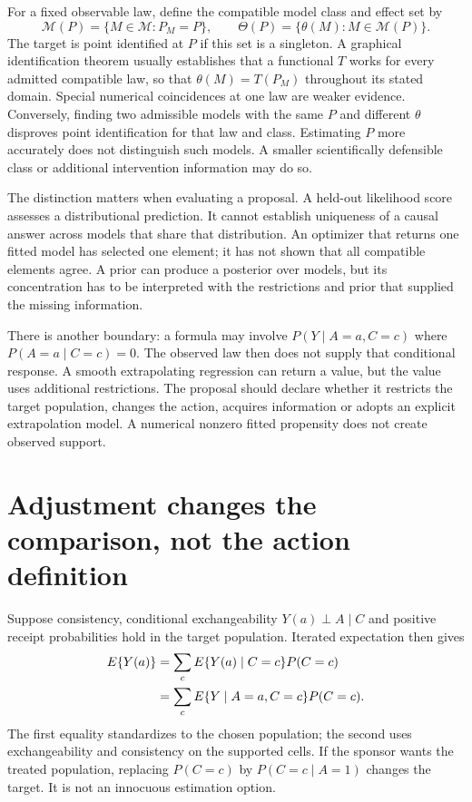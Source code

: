 For a fixed observable law, define the compatible model class and effect set by
\[
 \mathcal M(P)=\{M\in\mathcal M:P_M=P\},\qquad
 \Theta(P)=\{\theta(M):M\in\mathcal M(P)\}.
\]
The target is point identified at $P$ if this set is a singleton. A graphical
identification theorem usually establishes that a functional $T$ works for
every admitted compatible law, so that $\theta(M)=T(P_M)$ throughout its
stated domain. Special numerical coincidences at one law are weaker evidence.
Conversely, finding two admissible models with the same $P$ and different
$\theta$ disproves point identification for that law and class. Estimating
$P$ more accurately does not distinguish such models. A smaller scientifically
defensible class or additional intervention information may
do so.\citep{id2006,pearl2009}

The distinction matters when evaluating a proposal. A held-out likelihood
score assesses a distributional prediction. It cannot establish uniqueness
of a causal answer across models that share that distribution. An optimizer
that returns one fitted model has selected one element; it has not shown that
all compatible elements agree. A prior can produce a posterior over models,
but its concentration has to be interpreted with the restrictions and prior
that supplied the missing information.

There is another boundary: a formula may involve $P(Y\mid A=a,C=c)$ where
$P(A=a\mid C=c)=0$. The observed law then does not supply that conditional
response. A smooth extrapolating regression can return a value, but the value
uses additional restrictions. The proposal should declare whether it restricts
the target population, changes the action, acquires information or adopts
an explicit extrapolation model. A numerical nonzero fitted propensity
does not create observed support.

\section{Adjustment changes the comparison, not the action definition}
\label{exec17:s3-adjust}

Suppose consistency, conditional exchangeability
$Y(a)\mathrel{\perp}A\mid C$ and positive receipt probabilities hold in the
target population. Iterated expectation then gives
\begin{align}
 E\{Y(a)\}
 &=\sum_c E\{Y(a)\mid C=c\}P(C=c) \notag\\
 &=\sum_c E\{Y\mid A=a,C=c\}P(C=c).
 \label{exec17:s3-adjustment}
\end{align}
The first equality standardizes to the chosen population; the second uses
exchangeability and consistency on the supported cells. If the sponsor wants
the treated population, replacing $P(C=c)$ by $P(C=c\mid A=1)$ changes the
target. It is not an innocuous estimation option.

